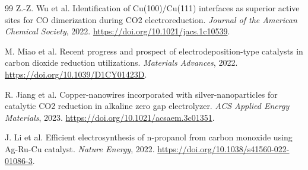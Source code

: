 \documentclass[11pt]{article}
\begin{document}
\begin{thebibliography}{99}
Z.-Z. Wu et al.
\newblock Identification of Cu(100)/Cu(111) interfaces as superior active sites for CO dimerization during CO2 electroreduction.
\newblock \emph{Journal of the American Chemical Society}, 2022.
\newblock \url{https://doi.org/10.1021/jacs.1c10539}.

M. Miao et al.
\newblock Recent progress and prospect of electrodeposition-type catalysts in carbon dioxide reduction utilizations.
\newblock \emph{Materials Advances}, 2022.
\newblock \url{https://doi.org/10.1039/D1CY01423D}.

R. Jiang et al.
\newblock Copper-nanowires incorporated with silver-nanoparticles for catalytic CO2 reduction in alkaline zero gap electrolyzer.
\newblock \emph{ACS Applied Energy Materials}, 2023.
\newblock \url{https://doi.org/10.1021/acsaem.3c01351}.

J. Li et al.
\newblock Efficient electrosynthesis of n-propanol from carbon monoxide using Ag-Ru-Cu catalyst.
\newblock \emph{Nature Energy}, 2022.
\newblock \url{https://doi.org/10.1038/s41560-022-01086-3}.

\end{thebibliography}
\end{document}
